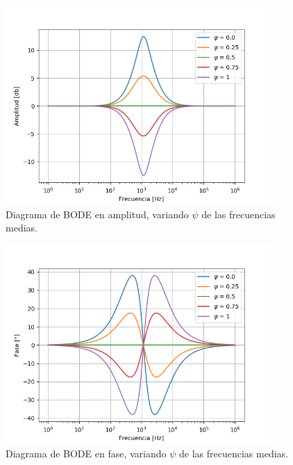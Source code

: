 \documentclass[a4paper]{article}
\begin{document}
\begin{figure}[H]
\centering
	\includegraphics[width=0.9\textwidth]{Imagenes/Medium-psi-bode.png}
	\caption{Diagrama de BODE en amplitud, variando $\psi$ de las frecuencias medias.}
	\label{fig:bode_modulo_med}
\end{figure}
\begin{figure}[H]
\centering
	\includegraphics[width=0.9\textwidth]{Imagenes/Medium-psi-ph.png}
	\caption{Diagrama de BODE en fase, variando $\psi$ de las frecuencias medias.}
	\label{fig:bode_ph_med}
\end{figure}
\end{document}
